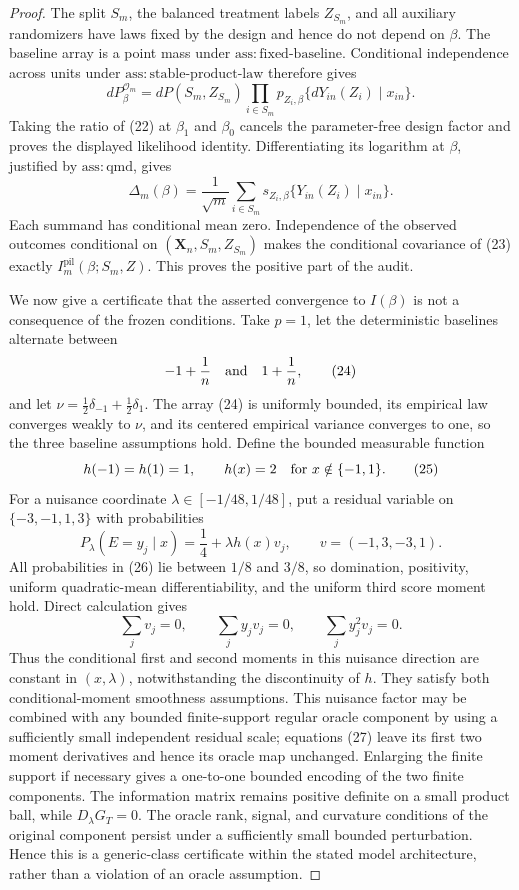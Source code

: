 \documentclass{article}
\begin{document}
\begin{proof}
The split \(S_m\), the balanced treatment labels \(Z_{S_m}\), and all auxiliary randomizers have laws fixed by the design and hence do not depend on \(\beta\).  The baseline array is a point mass under \(\mathrm{ass{:}fixed\text{-}baseline}\).  Conditional independence across units under \(\mathrm{ass{:}stable\text{-}product\text{-}law}\) therefore gives
\[
dP_\beta^{\mathcal O_m}
=dP(S_m,Z_{S_m})
\prod_{i\in S_m}
p_{Z_i,\beta}\{dY_{in}(Z_i)\mid x_{in}\}.
\tag{22}
\]
Taking the ratio of (22) at \(\beta_1\) and \(\beta_0\) cancels the parameter-free design factor and proves the displayed likelihood identity.  Differentiating its logarithm at \(\beta\), justified by \(\mathrm{ass{:}qmd}\), gives
\[
\Delta_m(\beta)
=\frac1{\sqrt m}\sum_{i\in S_m}
s_{Z_i,\beta}\{Y_{in}(Z_i)\mid x_{in}\}.
\tag{23}
\]
Each summand has conditional mean zero.  Independence of the observed outcomes conditional on \((\mathbf X_n,S_m,Z_{S_m})\) makes the conditional covariance of (23) exactly \(I_m^{\mathrm{pil}}(\beta;S_m,Z)\).  This proves the positive part of the audit.

We now give a certificate that the asserted convergence to \(I(\beta)\) is not a consequence of the frozen conditions.  Take \(p=1\), let the deterministic baselines alternate between
\[
-1+\frac1n
\quad\hbox{and}\quad
1+\frac1n,
\tag{24}
\]
and let \(\nu=\tfrac12\delta_{-1}+\tfrac12\delta_1\).  The array (24) is uniformly bounded, its empirical law converges weakly to \(\nu\), and its centered empirical variance converges to one, so the three baseline assumptions hold.  Define the bounded measurable function
\[
h(-1)=h(1)=1,
\qquad
h(x)=2\quad\hbox{for }x\notin\{-1,1\}.
\tag{25}
\]
For a nuisance coordinate \(\lambda\in[-1/48,1/48]\), put a residual variable on
\(\{-3,-1,1,3\}\) with probabilities
\[
P_\lambda(E=y_j\mid x)
=\frac14+\lambda h(x)v_j,
\qquad
v=(-1,3,-3,1).
\tag{26}
\]
All probabilities in (26) lie between \(1/8\) and \(3/8\), so domination, positivity, uniform quadratic-mean differentiability, and the uniform third score moment hold.  Direct calculation gives
\[
\sum_jv_j=0,\qquad
\sum_jy_jv_j=0,\qquad
\sum_jy_j^2v_j=0.
\tag{27}
\]
Thus the conditional first and second moments in this nuisance direction are constant in \((x,\lambda)\), notwithstanding the discontinuity of \(h\).  They satisfy both conditional-moment smoothness assumptions.  This nuisance factor may be combined with any bounded finite-support regular oracle component by using a sufficiently small independent residual scale; equations (27) leave its first two moment derivatives and hence its oracle map unchanged.  Enlarging the finite support if necessary gives a one-to-one bounded encoding of the two finite components.  The information matrix remains positive definite on a small product ball, while \(D_\lambda G_T=0\).  The oracle rank, signal, and curvature conditions of the original component persist under a sufficiently small bounded perturbation.  Hence this is a generic-class certificate within the stated model architecture, rather than a violation of an oracle assumption.


\end{proof}
\end{document}
